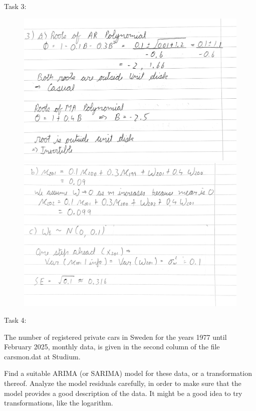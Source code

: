 \documentclass[a4paper,11pt]{article}
\begin{document}
    \newpage
    Task 3:    
    \begin{figure}[H]
        \centering
        \includegraphics[width=1\textwidth]{figure-markdown_strict/3-1.png}
        \includegraphics[width=1\textwidth]{figure-markdown_strict/3-2.png}
        \label{fig:3}
    \end{figure}

    \newpage
    Task 4:

    The number of registered private cars in Sweden for the years 1977 until February 2025, monthly data, is given in the second column of the file carsmon.dat at Studium. 
    
    Find a suitable ARIMA (or SARIMA) model for these data, or a transformation thereof. Analyze the model residuals carefully, in order to make sure that the model provides a good description of the data. It might be a good idea to try transformations, like the logarithm.
\end{document}
